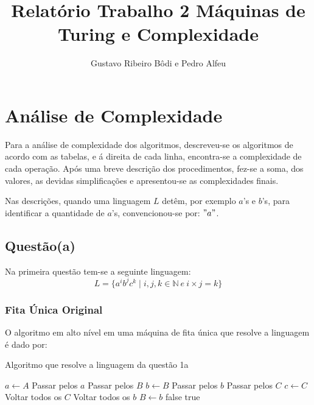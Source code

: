 \documentclass{article}
\author{Gustavo Ribeiro Bôdi e Pedro Alfeu}
\title{\vspace{-2.2cm}Relatório Trabalho 2 Máquinas de Turing e Complexidade}
\begin{document}
\maketitle
\section{Análise de Complexidade}

Para a análise de complexidade dos algoritmos, descreveu-se os algoritmos de
acordo com as tabelas, e á direita de cada linha, encontra-se a complexidade de
cada operação. Após uma breve descrição dos procedimentos, fez-se a soma, dos
valores, as devidas simplificações e apresentou-se as complexidades finais.

Nas descrições, quando uma linguagem $L$ detêm, por exemplo $a$'s e $b$'s,
para identificar a quantidade de $a$'s, convencionou-se por: $"a"$.

\subsection{Questão(a)}
Na primeira questão tem-se a seguinte linguagem: $$L=\{a^ib^jc^k \mid i,j,k \in \mathbb{N}\ e\ i\times j = k\}$$

\subsubsection{Fita Única Original}

O algoritmo em alto nível em uma máquina de fita única que resolve a linguagem é dado por:

\begin{algorithm} 
  \caption{Algoritmo que resolve a linguagem da questão 1a}
\begin{algorithmic}[1]
\State $a \gets A$
\State Passar pelos $a$
\State Passar pelos $B$
  \State $b \gets B$
  \State Passar pelos $b$
  \State Passar pelos $C$
  \State $c \gets C$
  \State Voltar todos os $C$
  \State Voltar todos os $b$
\EndFor
{}
\State $B \gets b$
\EndFor
\EndFor
{}
  \State \Return false
  \EndIf
\EndFor
\State \Return true
\end{algorithmic}
\end{algorithm}
\end{document}
